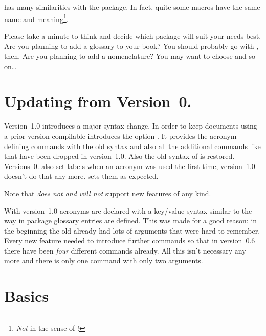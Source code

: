 \documentclass[DIV10,toc=index,toc=bib,hyperfootnotes=false]{cnpkgdoc}
\makeatletter
\newcommand\versionstar{\texorpdfstring{\@versionstar}{*}}
\makeatother
\begin{document}
\acro has many similarities with the  package. In fact, quite
some macros have the same name and meaning\footnote{\emph{Not} in the sense of
\code{\textbackslash\textcolor{code}{meaning}}!}.

Please take a minute to think and decide which package will suit your needs
best. Are you planning to add a glossary to your book? You should probably go
with , then. Are you planning to add a nomenclature? You
may want to choose  and so on\ldots


\section{Updating from Version~0.\versionstar}
Version~1.0 introduces a major syntax change. In order to keep documents
using a prior version compilable \acro introduces the option .
It provides the acronym defining commands with the old syntax and also all the
additional commands like  that have been dropped in
version~1.0. Also the old syntax of  is restored.
Versions~0.\versionstar{} also set labels when an acronym was used the first time,
version~1.0 doesn't do that any more.  sets them as expected.

Note that  \emph{does not and will not} support new features of
any kind.

With version~1.0 acronyms are declared with a key/value syntax similar to the
way in package  glossary entries are defined. This was made
for a good reason: in the beginning the old  already had
lots of arguments that were hard to remember. Every new feature needed to
introduce further commands so that in version~0.6 there have been \emph{four}
different commands already. All this isn't necessary any more and there is only
one command with only two arguments.

\section{Basics}
\end{document}
